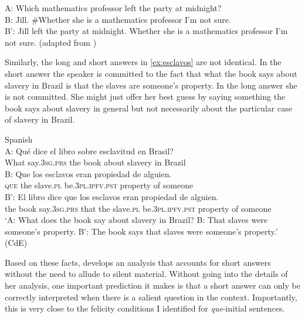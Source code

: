 \ea \label{ex:jill}
	A: Which mathematics professor left the party at midnight?\\
	B: Jill. \#Whether she is a mathematics professor I’m not sure.\\
	B’: Jill left the party at midnight. Whether she is a mathematics professor I’m not sure.
	(adapted from \citealt[342: ex 14]{Jacobson2016})
\z

Similarly, the long and short answers in \eqref{ex:esclavos} are not identical. In the short answer the speaker
is committed to the fact that what the book says about slavery in Brazil is that the slaves
are someone’s property. In the long answer she is not committed. She might just offer her best
guess by saying something the book says about slavery in general but not necessarily about
the particular case of slavery in Brazil.

\ea\label{ex:esclavos} 
 Spanish\\ 
\gll  A: Qué dice el libro sobre esclavitud en Brasil? 
\\
	{} What say.\textsc{3sg.prs} the book about slavery
	in Brazil\\
\exi{}  \gll B: Que los esclavos eran propiedad de alguien.
\\
{} \textsc{que} the slave.\textsc{pl} be.\textsc{3pl.ipfv.pst} property of someone
\\
\exi{} \gll B’: El libro dice que los esclavos eran propiedad de alguien.
\\
{} the book say.\textsc{3sg.prs} that the slave.\textsc{pl} be.\textsc{3pl.ipfv.pst} property of someone
\\
\glt  `A: What does the book say about slavery in Brazil? B: That slaves were someone’s
property. B’: The book says that slaves were someone’s property.' (CdE)
\z


Based on these facts, \citet{Jacobson2016} develops an analysis that accounts for short answers
without the need to allude to silent material. Without going into the details of her analysis, one important
prediction it makes is that a short answer can only be correctly interpreted when there is
a salient question in the context. Importantly, this is very close to the felicity conditions I
identified for \emph{que}-initial sentences.


